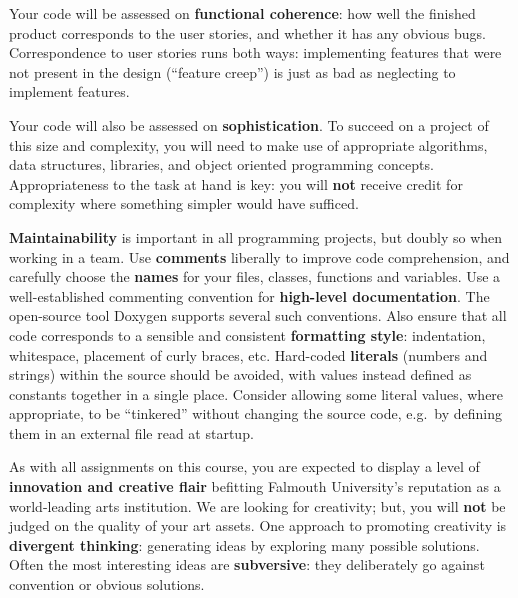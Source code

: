 \documentclass{../fal_assignment}
\begin{document}

Your code will be assessed on \textbf{functional coherence}:
how well the finished product corresponds to the user stories,
and whether it has any obvious bugs.
Correspondence to user stories runs both ways:
implementing features that were not present in the design (``feature creep'')
is just as bad as neglecting to implement features.

Your code will also be assessed on \textbf{sophistication}.
To succeed on a project of this size and complexity,
you will need to make use of appropriate algorithms, data structures, libraries, and object oriented programming concepts.
Appropriateness to the task at hand is key:
you will \textbf{not} receive credit for complexity  
where something simpler would have sufficed.

\textbf{Maintainability} is important in all programming projects,
but doubly so when working in a team.
Use \textbf{comments} liberally to improve code comprehension,
and carefully choose the \textbf{names} for your files, classes, functions and variables.
Use a well-established commenting convention
for \textbf{high-level documentation}.
The open-source tool Doxygen supports several such conventions.
Also ensure that all code corresponds to a sensible and consistent \textbf{formatting style}:
indentation, whitespace, placement of curly braces, etc.
Hard-coded \textbf{literals} (numbers and strings) within the source should be avoided,
with values instead defined as constants together in a single place.
Consider allowing some literal values, where appropriate, to be ``tinkered'' without changing the source code,
e.g.\ by defining them in an external file read at startup.

As with all assignments on this course, you are expected to display a level of
\textbf{innovation and creative flair} befitting Falmouth University's reputation as a world-leading
arts institution.
We are looking for creativity; but, 
you will \textbf{not} be judged on the quality of your art assets.
One approach to promoting creativity is
\textbf{divergent thinking}: generating ideas by exploring many possible solutions.
Often the most interesting ideas are \textbf{subversive}: they deliberately go against
convention or obvious solutions.
\end{document}
